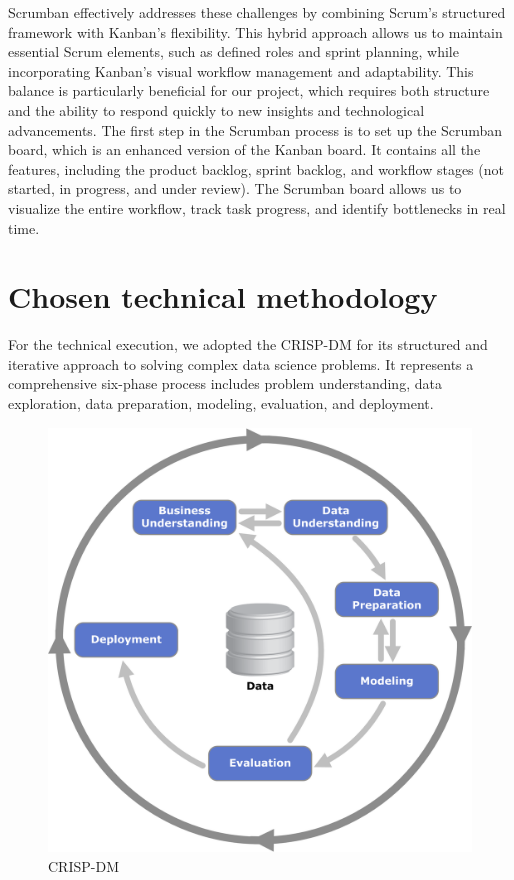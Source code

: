 \par Scrumban effectively addresses these challenges by combining Scrum's structured framework with Kanban's flexibility. This hybrid approach allows us to maintain essential Scrum elements, such as defined roles and sprint planning, while incorporating Kanban's visual workflow management and adaptability. This balance is particularly beneficial for our project, which requires both structure and the ability to respond quickly to new insights and technological advancements.
The first step in the Scrumban process is to set up the Scrumban board, which is an enhanced version of the Kanban board. It contains all the features, including the product backlog, sprint backlog, and workflow stages (not started, in progress, and under review). The Scrumban board allows us to visualize the entire workflow, track task progress, and identify bottlenecks in real time. 
\section{Chosen technical methodology}

For the technical execution, we adopted the CRISP-DM for its structured
and iterative approach to solving complex data science problems. It
represents a comprehensive six-phase process includes problem understanding, data exploration, data preparation, modeling, evaluation, and
deployment.
\begin{center}
\begin{figure}[H]
            \centering
            \includegraphics[scale=0.44]{images/CRISP.png}
            \caption{CRISP-DM} 
            \label{fig:CRISP_DM}
        \end{figure}
\end{center}

